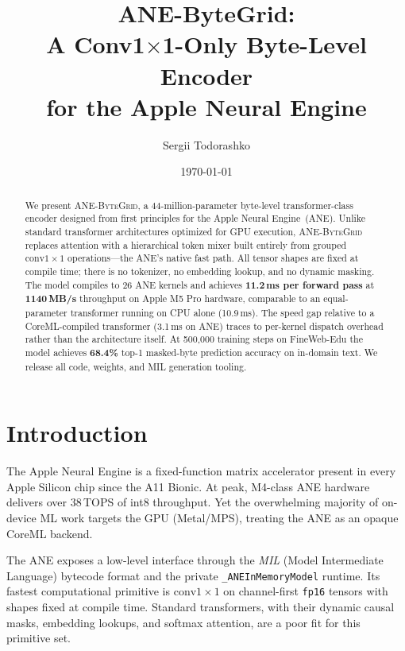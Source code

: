 \documentclass[10pt,twocolumn]{article}
\title{%
  \textbf{ANE-ByteGrid:}\\
  A Conv1$\times$1-Only Byte-Level Encoder\\
  for the Apple Neural Engine
}
\author{
  Sergii Todorashko
}
\date{\today}
\newcommand{\bytegrid}{\textsc{ANE-ByteGrid}}
\begin{document}
\maketitle

\begin{abstract}
We present \bytegrid{}, a 44-million-parameter byte-level transformer-class
encoder designed from first principles for the Apple Neural Engine~(ANE).
Unlike standard transformer architectures optimized for GPU execution,
\bytegrid{} replaces attention with a hierarchical token mixer built
entirely from grouped $\text{conv}1{\times}1$ operations---the ANE's
native fast path.
All tensor shapes are fixed at compile time; there is no tokenizer,
no embedding lookup, and no dynamic masking.
The model compiles to 26 ANE kernels and achieves
\textbf{11.2\,ms per forward pass} at \textbf{1140\,MB/s} throughput
on Apple M5 Pro hardware, comparable to an equal-parameter transformer
running on CPU alone (10.9\,ms).
The speed gap relative to a CoreML-compiled transformer (3.1\,ms on ANE)
traces to per-kernel dispatch overhead rather than the architecture itself.
At 500{,}000 training steps on FineWeb-Edu the model achieves
\textbf{68.4\%} top-1 masked-byte prediction accuracy on in-domain text.
We release all code, weights, and MIL generation tooling.
\end{abstract}

\section{Introduction}
\label{sec:intro}

The Apple Neural Engine is a fixed-function matrix accelerator present in
every Apple Silicon chip since the A11 Bionic.
At peak, M4-class ANE hardware delivers over 38\,TOPS of int8 throughput.
Yet the overwhelming majority of on-device ML work targets the GPU
(Metal/MPS), treating the ANE as an opaque CoreML backend.

The ANE exposes a low-level interface through the \emph{MIL} (Model
Intermediate Language) bytecode format and the private
\texttt{\_ANEInMemoryModel} runtime.
Its fastest computational primitive is $\text{conv}1{\times}1$ on
channel-first \texttt{fp16} tensors with shapes fixed at compile time.
Standard transformers, with their dynamic causal masks, embedding lookups,
and softmax attention, are a poor fit for this primitive set.
\end{document}
